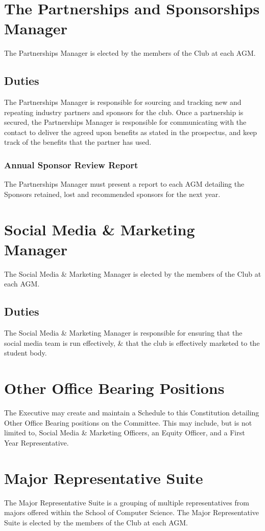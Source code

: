 \documentclass[11pt]{article}
\begin{document}
\section{The Partnerships and Sponsorships Manager}
The Partnerships Manager is elected by the members of the Club at each AGM.
\subsection{Duties}
The Partnerships Manager is responsible for sourcing and tracking new and repeating industry partners and sponsors for the club.
Once a partnership is secured, the Partnerships Manager is responsible for communicating with the contact to deliver the agreed upon benefits as stated in the prospectus, and keep track of the benefits that the partner has used.
\subsubsection{Annual Sponsor Review Report}
The Partnerships Manager must present a report to each AGM detailing the Sponsors retained, lost and recommended sponsors for the next year.

\section{Social Media \& Marketing Manager}
The Social Media \& Marketing Manager is elected by the members of the Club at each AGM.
\subsection{Duties}
The Social Media \& Marketing Manager is responsible for ensuring that the social media team is run effectively, \& that the club is effectively marketed to the student body.

\section{Other Office Bearing Positions}
The Executive may create and maintain a Schedule to this Constitution detailing Other Office Bearing positions on the Committee. This may include, but is not limited to, Social Media \& Marketing Officers, an Equity Officer, and a First Year Representative. 

\section{Major Representative Suite}
The Major Representative Suite is a grouping of multiple representatives from majors offered within the School of Computer Science. The Major Representative Suite is elected by the members of the Club at each AGM.
\end{document}
